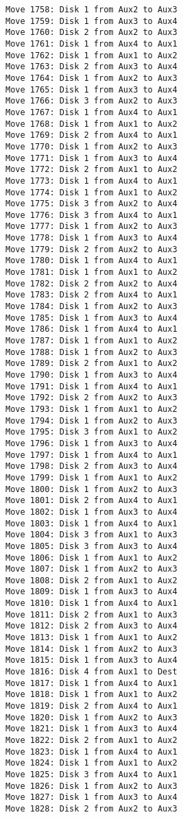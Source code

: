 \documentclass[11pt]{article}
\begin{document}
\begin{multicols}{2}
\begin{Verbatim}[fontsize=\small]
Move 1758: Disk 1 from Aux2 to Aux3
Move 1759: Disk 1 from Aux3 to Aux4
Move 1760: Disk 2 from Aux2 to Aux3
Move 1761: Disk 1 from Aux4 to Aux1
Move 1762: Disk 1 from Aux1 to Aux2
Move 1763: Disk 2 from Aux3 to Aux4
Move 1764: Disk 1 from Aux2 to Aux3
Move 1765: Disk 1 from Aux3 to Aux4
Move 1766: Disk 3 from Aux2 to Aux3
Move 1767: Disk 1 from Aux4 to Aux1
Move 1768: Disk 1 from Aux1 to Aux2
Move 1769: Disk 2 from Aux4 to Aux1
Move 1770: Disk 1 from Aux2 to Aux3
Move 1771: Disk 1 from Aux3 to Aux4
Move 1772: Disk 2 from Aux1 to Aux2
Move 1773: Disk 1 from Aux4 to Aux1
Move 1774: Disk 1 from Aux1 to Aux2
Move 1775: Disk 3 from Aux2 to Aux4
Move 1776: Disk 3 from Aux4 to Aux1
Move 1777: Disk 1 from Aux2 to Aux3
Move 1778: Disk 1 from Aux3 to Aux4
Move 1779: Disk 2 from Aux2 to Aux3
Move 1780: Disk 1 from Aux4 to Aux1
Move 1781: Disk 1 from Aux1 to Aux2
Move 1782: Disk 2 from Aux2 to Aux4
Move 1783: Disk 2 from Aux4 to Aux1
Move 1784: Disk 1 from Aux2 to Aux3
Move 1785: Disk 1 from Aux3 to Aux4
Move 1786: Disk 1 from Aux4 to Aux1
Move 1787: Disk 1 from Aux1 to Aux2
Move 1788: Disk 1 from Aux2 to Aux3
Move 1789: Disk 2 from Aux1 to Aux2
Move 1790: Disk 1 from Aux3 to Aux4
Move 1791: Disk 1 from Aux4 to Aux1
Move 1792: Disk 2 from Aux2 to Aux3
Move 1793: Disk 1 from Aux1 to Aux2
Move 1794: Disk 1 from Aux2 to Aux3
Move 1795: Disk 3 from Aux1 to Aux2
Move 1796: Disk 1 from Aux3 to Aux4
Move 1797: Disk 1 from Aux4 to Aux1
Move 1798: Disk 2 from Aux3 to Aux4
Move 1799: Disk 1 from Aux1 to Aux2
Move 1800: Disk 1 from Aux2 to Aux3
Move 1801: Disk 2 from Aux4 to Aux1
Move 1802: Disk 1 from Aux3 to Aux4
Move 1803: Disk 1 from Aux4 to Aux1
Move 1804: Disk 3 from Aux1 to Aux3
Move 1805: Disk 3 from Aux3 to Aux4
Move 1806: Disk 1 from Aux1 to Aux2
Move 1807: Disk 1 from Aux2 to Aux3
Move 1808: Disk 2 from Aux1 to Aux2
Move 1809: Disk 1 from Aux3 to Aux4
Move 1810: Disk 1 from Aux4 to Aux1
Move 1811: Disk 2 from Aux1 to Aux3
Move 1812: Disk 2 from Aux3 to Aux4
Move 1813: Disk 1 from Aux1 to Aux2
Move 1814: Disk 1 from Aux2 to Aux3
Move 1815: Disk 1 from Aux3 to Aux4
Move 1816: Disk 4 from Aux1 to Dest
Move 1817: Disk 1 from Aux4 to Aux1
Move 1818: Disk 1 from Aux1 to Aux2
Move 1819: Disk 2 from Aux4 to Aux1
Move 1820: Disk 1 from Aux2 to Aux3
Move 1821: Disk 1 from Aux3 to Aux4
Move 1822: Disk 2 from Aux1 to Aux2
Move 1823: Disk 1 from Aux4 to Aux1
Move 1824: Disk 1 from Aux1 to Aux2
Move 1825: Disk 3 from Aux4 to Aux1
Move 1826: Disk 1 from Aux2 to Aux3
Move 1827: Disk 1 from Aux3 to Aux4
Move 1828: Disk 2 from Aux2 to Aux3

\end{Verbatim}
\end{multicols}
\end{document}
